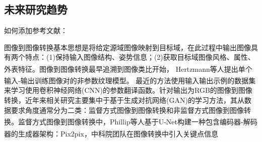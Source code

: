 \documentclass[12pt,AutoFakeBold]{article}
\newcommand{\upcite}[1]{{\textsuperscript{\cite{#1}}}}
\begin{document}
\subsection{未来研究趋势}

如何添加参考文献：

图像到图像转换基本思想是将给定源域图像映射到目标域，在此过程中输出图像具有两个特点：(1)保持输入图像结构、姿势信息；(2)获取目标域图像风格、属性、外表特征。图像到图像转换最早追溯到图像类比\upcite{hertzmann2001image}开始， Hertzmann等人\upcite{efros1999texture}提出单个输入-输出训练图像对的非参数纹理模型。 最近的方法\upcite{long2015fully}使用输入输出示例的数据集来学习使用卷积神经网络(CNN)的参数翻译函数。针对输出为RGB的图像到图像转换，近年来相关研究主要集中于基于生成对抗网络(GAN)的学习方法，其从数据要求角度通常分为二类：监督方式图像到图像转换和非监督方式图像到图像转换。监督方式图像到图像转换中，Phillip等人\upcite{pix2pix2017}基于U-Net构建一种包含编码器-解码器的生成器架构：Pix2pix，中科院团队\upcite{song2018geometry}在图像转换中引入关键点信息



{\small


}
\end{document}
